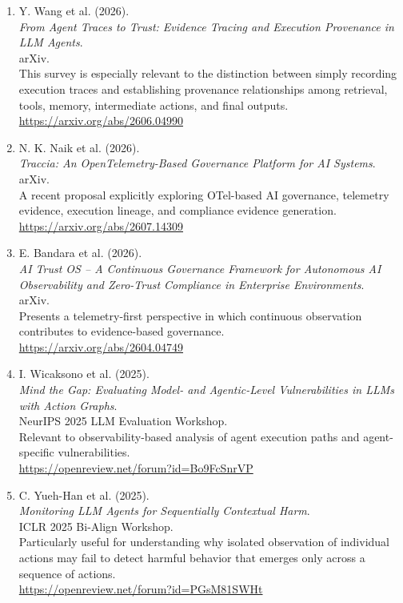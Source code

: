 \documentclass[11pt,a4paper]{article}
\begin{document}
\begin{enumerate}

\item Y. Wang et al. (2026).\\
\textit{From Agent Traces to Trust: Evidence Tracing and Execution Provenance in LLM Agents}.\\
arXiv.\\
This survey is especially relevant to the distinction between simply recording execution traces and establishing provenance relationships among retrieval, tools, memory, intermediate actions, and final outputs.\\
\url{https://arxiv.org/abs/2606.04990}

\item N. K. Naik et al. (2026).\\
\textit{Traccia: An OpenTelemetry-Based Governance Platform for AI Systems}.\\
arXiv.\\
A recent proposal explicitly exploring OTel-based AI governance, telemetry evidence, execution lineage, and compliance evidence generation.\\
\url{https://arxiv.org/abs/2607.14309}

\item E. Bandara et al. (2026).\\
\textit{AI Trust OS -- A Continuous Governance Framework for Autonomous AI Observability and Zero-Trust Compliance in Enterprise Environments}.\\
arXiv.\\
Presents a telemetry-first perspective in which continuous observation contributes to evidence-based governance.\\
\url{https://arxiv.org/abs/2604.04749}

\item I. Wicaksono et al. (2025).\\
\textit{Mind the Gap: Evaluating Model- and Agentic-Level Vulnerabilities in LLMs with Action Graphs}.\\
NeurIPS 2025 LLM Evaluation Workshop.\\
Relevant to observability-based analysis of agent execution paths and agent-specific vulnerabilities.\\
\url{https://openreview.net/forum?id=Bo9FcSnrVP}

\item C. Yueh-Han et al. (2025).\\
\textit{Monitoring LLM Agents for Sequentially Contextual Harm}.\\
ICLR 2025 Bi-Align Workshop.\\
Particularly useful for understanding why isolated observation of individual actions may fail to detect harmful behavior that emerges only across a sequence of actions.\\
\url{https://openreview.net/forum?id=PGsM81SWHt}


\end{enumerate}
\end{document}
